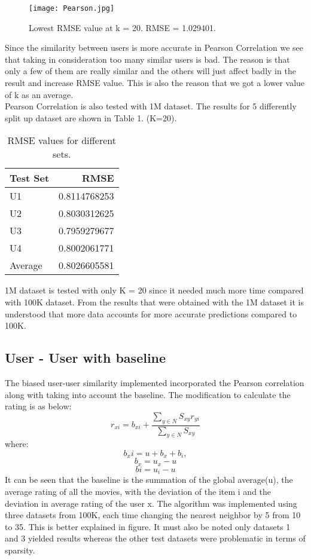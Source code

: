 \documentclass[a4paper]{article}
\begin{document}
\begin{figure} [h]
\centering
\texttt{[image: Pearson.jpg]}
\caption{\label{fig:Pearson}Lowest RMSE value at k = 20. RMSE = 1.029401.}
\end{figure}

Since the similarity between users is more accurate in Pearson Correlation we see that taking in consideration too many similar users is bad. The reason is that only a few of them are really similar and the others will just affect badly in the result and increase RMSE value. This is also the reason that we got a lower value of k as an average.\\
Pearson Correlation is also tested with 1M dataset. The results for 5 differently split up dataset are shown in Table 1. (K=20).

\begin{table} [h]
\centering
\begin{tabular}{l|r}
Test Set & RMSE \\\hline
U1 & 0.8114768253 \\
U2 & 0.8030312625 \\
U3 & 0.7959279677 \\
U4 & 0.8002061771 \\
Average & 0.8026605581
\end{tabular}
\caption{\label{tab:widgets}RMSE values for different sets.}
\end{table}

1M dataset is tested with only K = 20 since it needed much more time compared with 100K dataset. From the results that were obtained with the 1M dataset it is understood that more data accounts for  more accurate predictions compared to 100K.


\subsection{User - User with baseline}
The biased user-user similarity implemented incorporated the Pearson correlation along with taking into account the baseline. The modification to calculate the rating is as below:
$$ r_{xi} = b_{xi} + \frac{\sum_{y\in N}S_{xy} r_{yi}}{\sum_{y \in N}S_{xy}}$$
where:
$$b_xi = u + b_x + b_i,$$
$$b_x = u_x - u$$
$$bi = u_i - u$$
It can be seen that the baseline is the summation of the global average(u), the average rating of all the movies, with the deviation of the item i and the deviation in average rating of the user x.
The algorithm was implemented using three datasets from 100K, each time changing the nearest neighbor by 5 from 10 to 35. This is better explained in figure. It must also be noted only datasets 1 and 3 yielded results whereas the other test datasets were problematic in terms of sparsity. 
\end{document}
